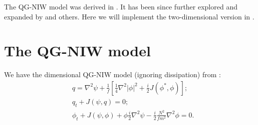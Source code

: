 \graphicspath{{2D_QGNIW/code/plot_snap/figs/}}

The QG-NIW model was derived in \cite{XieVanneste_15}. It has been since further explored and expanded by \cite{WagnerYoung_15, WagnerYoung_16, AsselinYoung_19, Xie_20} and others. Here we will implement the two-dimensional version in \cite{RochaEtAl_18}. 

\section{The QG-NIW model}
We have the dimensional QG-NIW model (ignoring dissipation) from \cite[(2.6--8)]{RochaEtAl_18}:
\begin{align}
    &q = \nabla^2\psi + \frac{1}{f}\left[\frac{1}{4}\nabla^2|\phi|^2+\frac{i}{2}J(\phi^*,\phi)\right];\\
    &q_t + J(\psi,q) = 0;\\
    &\phi_t+J(\psi,\phi)+\phi\frac{i}{2}\nabla^2\psi-\frac{i}{2} \frac{N^2}{f m^2} \nabla^2\phi = 0.
\end{align}

